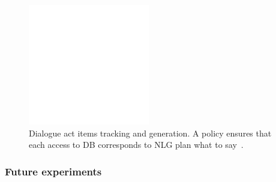 \documentclass[11pt]{article}
\begin{document}
\begin{figure}[htpb]
    \centering
    \includegraphics[width=0.8\linewidth]{todo}
    \caption{Dialogue act items tracking and generation. A policy ensures that each access to DB corresponds to NLG plan what to say~\cite{dusek_sequence2sequence_2016}.}
    \label{fig:dai_gen}
\end{figure}

\subsubsection*{Future experiments}
\end{document}
